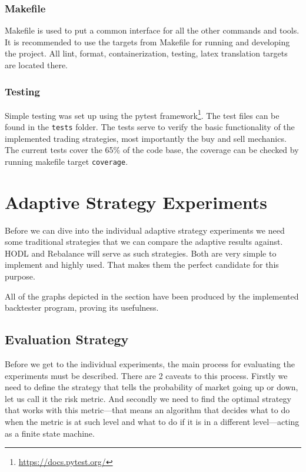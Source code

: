 \subsection*{Makefile}
Makefile is used to put a common interface for all the other commands and tools. It is recommended to use the targets from Makefile for running and developing the project. All lint, format, containerization, testing, latex translation targets are located there.

\subsection*{Testing}
Simple testing was set up using the pytest framework\footnote{\url{https://docs.pytest.org/}}. The test files can be found in the \texttt{tests} folder. The tests serve to verify the basic functionality of the implemented trading strategies, most importantly the buy and sell mechanics. The current tests cover the 65\% of the code base, the coverage can be checked by running makefile target \texttt{coverage}.

\chapter{Adaptive Strategy Experiments}
\label{chapter-experiments}

Before we can dive into the individual adaptive strategy experiments we need some traditional strategies that we can compare the adaptive results against. HODL and Rebalance will serve as such strategies. Both are very simple to implement and highly used. That makes them the perfect candidate for this purpose.

All of the graphs depicted in the section have been produced by the implemented backtester program, proving its usefulness.

\section{Evaluation Strategy}
Before we get to the individual experiments, the main process for evaluating the experiments must be described. There are 2 caveats to this process. Firstly we need to define the strategy that tells the probability of market going up or down, let us call it the risk metric. And secondly we need to find the optimal strategy that works with this metric---that means an algorithm that decides what to do when the metric is at such level and what to do if it is in a different level---acting as a finite state machine.

